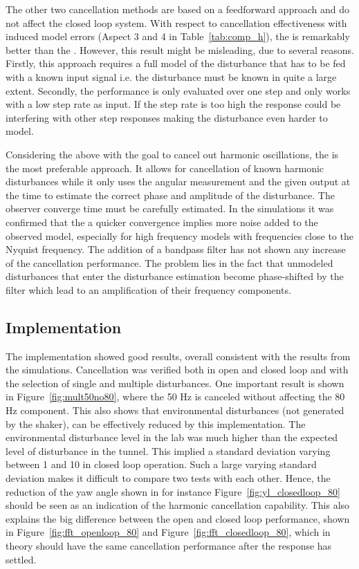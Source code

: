 The other two cancellation methods are based on a feedforward approach and do not affect the closed loop system. With respect to cancellation effectiveness with induced model errors (Aspect 3 and 4 in Table~\ref{tab:comp_h}), the \abbrFDC is remarkably better than the \abbrRFDC. However, this result might be misleading, due to several reasons. Firstly, this approach requires a full model of the disturbance that has to be fed with a known input signal i.e. the disturbance must be known in quite a large extent. Secondly, the \abbrFDC performance is only evaluated over one step and only works with a low step rate as input. If the step rate is too high the response could be interfering with other step responses making the disturbance even harder to model.

Considering the above with the goal to cancel out harmonic oscillations, the \abbrRFDC is the most preferable approach. It allows for cancellation of known harmonic disturbances while it only uses the angular measurement and the given output at the time to estimate the correct phase and amplitude of the disturbance. The observer converge time must be carefully estimated. In the simulations it was confirmed that the a quicker convergence implies more noise added to the observed model, especially for high frequency models with frequencies close to the Nyquist frequency. The addition of a bandpass filter has not shown any increase of the cancellation performance. The problem lies in the fact that unmodeled disturbances that enter the disturbance estimation become phase-shifted by the filter which lead to an amplification of their frequency components.

\subsection{Implementation}
The \abbrRFDC implementation showed good results, overall consistent with the results from the simulations. Cancellation was verified both in open and closed loop and with the selection of single and multiple disturbances. One important result is shown in Figure~\ref{fig:mult50no80}, where the 50 Hz is canceled without affecting the 80 Hz component. This also shows that environmental disturbances (not generated by the shaker), can be effectively reduced by this implementation. The environmental disturbance level in the lab was much higher than the expected level of disturbance in the tunnel. This implied a standard deviation varying between \unit{1}{\micro\radian} and \unit{10}{\micro\radian} in closed loop operation. Such a large varying standard deviation makes it difficult to compare two tests with each other. Hence, the reduction of the yaw angle shown in for instance Figure~\ref{fig:yl_closedloop_80} should be seen as an indication of the harmonic cancellation capability. This also explains the big difference between the open and closed loop performance, shown in Figure~\ref{fig:fft_openloop_80} and Figure~\ref{fig:fft_closedloop_80}, which in theory should have the same cancellation performance after the response has settled.

